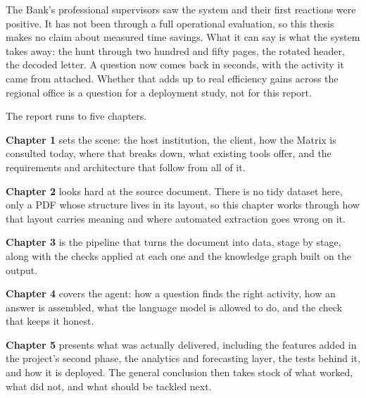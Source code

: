 The Bank's professional supervisors saw the system and their first reactions
were positive. It has not been through a full operational evaluation, so this
thesis makes no claim about measured time savings. What it can say is what the
system takes away: the hunt through two hundred and fifty pages, the rotated
header, the decoded letter. A question now comes back in seconds, with the
activity it came from attached. Whether that adds up to real efficiency gains
across the regional office is a question for a deployment study, not for this
report.


The report runs to five chapters.

\textbf{Chapter 1} sets the scene: the host institution, the client, how the
Matrix is consulted today, where that breaks down, what existing tools offer,
and the requirements and architecture that follow from all of it.

\textbf{Chapter 2} looks hard at the source document. There is no tidy dataset
here, only a PDF whose structure lives in its layout, so this chapter works
through how that layout carries meaning and where automated extraction goes
wrong on it.

\textbf{Chapter 3} is the pipeline that turns the document into data, stage by
stage, along with the checks applied at each one and the knowledge graph built
on the output.

\textbf{Chapter 4} covers the agent: how a question finds the right activity,
how an answer is assembled, what the language model is allowed to do, and the
check that keeps it honest.

\textbf{Chapter 5} presents what was actually delivered, including the features
added in the project's second phase, the analytics and forecasting layer, the
tests behind it, and how it is deployed. The general conclusion then takes stock
of what worked, what did not, and what should be tackled next.
